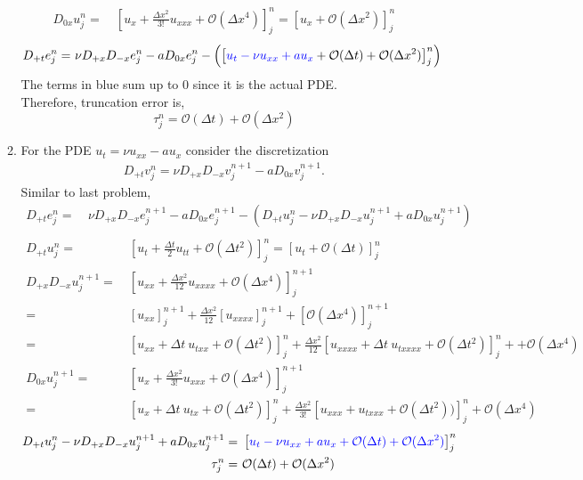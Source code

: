 \documentclass[11pt]{article}
\newcommand{\Dpt}{D_{+t}}
\newcommand{\Dpx}{D_{+x}}
\newcommand{\Dmx}{D_{-x}}
\newcommand{\Dzx}{D_{0x}}
\newcommand{\Oc}{\mathcal{O}}
\newcommand{\dx}{\Delta x}
\newcommand{\dt}{\Delta t}
\newcommand{\texp}[3]{\left[#1\right]^{#2}_{#3}}
\newcommand{\ux}{u_x}
\newcommand{\uxx}{u_{xx}}
\newcommand{\uxxx}{u_{xxx}}
\newcommand{\uxxxx}{u_{xxxx}}
\newcommand{\ut}{u_t}
\newcommand{\enj}{e^{n}_{j}}
\newcommand{\enpj}{e^{n+1}_{j}}
\newcommand{\unj}{u^{n}_{j}}
\newcommand{\unpj}{u^{n+1}_{j}}
\begin{document}
\begin{enumerate}
\begin{enumerate}
\begin{align*}
        \Dzx \unj = & \ \texp{\ux + \frac{\dx^2}{3!}\uxxx + \Oc(\dx^4)}{n}{j} = \texp{\ux + \Oc(\dx^2)}{n}{j}
        \end{align*}
        \begin{align*}
        \Dpt \enj = & \ \nu \Dpx\Dmx \enj -a\Dzx \enj - \left(\texp{{\color{blue}\ut - \nu \uxx + a\ux} + \Oc(\dt) + \Oc(\dx^2)}{n}{j}\right)
        \end{align*}
        The terms in blue sum up to 0 since it is the actual PDE. \\
        Therefore, truncation error is,
        \[
        \tau^n_j = \Oc(\dt) + \Oc(\dx^2)
        \]
      \item {\color{blue}For the PDE }$u_t= \nu u_{xx}-au_x$ {\color{blue}consider the discretization}
        \begin{align*}
          \Dpt v_j^n = \nu\Dpx\Dmx v_j^{n+1}-a\Dzx v_j^{n+1}.
        \end{align*}
        Similar to last problem,
        \begin{align*}
        \Dpt \enj = & \ \nu \Dpx\Dmx \enpj -a\Dzx \enpj -\left(\Dpt \unj - \nu \Dpx\Dmx \unpj +a\Dzx \unpj \right) \\
        \end{align*}
        \begin{align*}
        \Dpt \unj = & \  \texp{\ut + \frac{\dt}{2}u_{tt} + \Oc(\dt^2)}{n}{j} = \texp{\ut + \Oc(\dt)}{n}{j}\\
        \Dpx\Dmx \unpj = & \ \texp{\uxx + \frac{\dx^2}{12}\uxxxx + \Oc(\dx^4)}{n+1}{j} \\
        = & \ \texp{\uxx}{n+1}{j} + \frac{\dx^2}{12}\texp{\uxxxx}{n+1}{j} + \texp{\Oc(\dx^4)}{n+1}{j} \\
        = & \ \texp{\uxx + \dt \ u_{txx} + \Oc(\dt^2)}{n}{j} + \frac{\dx^2}{12}\texp{\uxxxx + \dt \ u_{txxxx} + \Oc(\dt^2)}{n}{j} + + \Oc(\dx^4)\\
        \Dzx \unpj = & \ \texp{\ux + \frac{\dx^2}{3!}\uxxx + \Oc(\dx^4)}{n+1}{j} \\
        = & \ \texp{\ux + \dt \ u_{tx} + \Oc(\dt^2)}{n}{j} + \frac{\dx^2}{3!} \texp{\uxxx + u_{txxx} + \Oc(\dt^2))}{n}{j} + \Oc(\dx^4) 
        \end{align*}
        \begin{align*}
        \Dpt\unj - \nu\Dpx\Dmx \unpj + a\Dzx\unpj = & \ \texp{{\color{blue}\ut - \nu\uxx + a\ux + \Oc(\dt) + \Oc(\dx^2)}}{n}{j}\\
        \tau^{n}_{j} = & \ \Oc(\dt) + \Oc(\dx^2)
        \end{align*}

\end{enumerate}
\end{enumerate}
\end{document}
